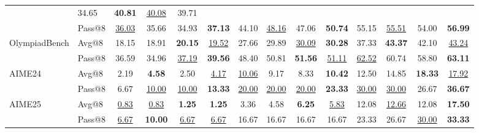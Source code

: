 \begin{table}[!t]
{\begin{tabular}{ll*{4}{c}*{4}{c}*{4}{c}}
    & 34.65 & \textbf{40.81} & \underline{40.08} & \cellcolor{blue!10}39.71 \\
    & Pass@8 
    & \underline{36.03} & 35.66 & 34.93 & 
    \cellcolor{blue!10} \textbf{37.13} 
    & 44.10 & \underline{48.16} & 47.06 & \cellcolor{blue!10}\textbf{50.74} 
    & 55.15 & \underline{55.51} & 54.00 & \cellcolor{blue!10}\textbf{56.99} \\
\midrule
\multirow{2}{*}{OlympiadBench}
    & Avg@8  
    & 18.15 & 18.91 & \textbf{20.15} & 
    \cellcolor{blue!10} \underline{19.52} 
    & 27.66 & 29.89 & \underline{30.09} & \cellcolor{blue!10}\textbf{30.28} 
    & 37.33 & \textbf{43.37} & 42.10 & \cellcolor{blue!10}\underline{43.24} \\
    & Pass@8 
    & 36.59 & 34.96 & \underline{37.19} & 
    \cellcolor{blue!10} \textbf{39.56} 
    & 48.40 & 50.81 & \textbf{51.56} & \cellcolor{blue!10}\underline{51.11} 
    & \underline{62.52} & 60.74 & 58.80 & \cellcolor{blue!10}\textbf{63.11} \\
\midrule
\multirow{2}{*}{AIME24}
    & Avg@8  
    & 2.19 & \textbf{4.58} & 2.50 &
    \cellcolor{blue!10} \underline{4.17} 
    & \underline{10.06} & 9.17 & 8.33 & \cellcolor{blue!10}\textbf{10.42} 
    & 12.50 & 14.85 & \textbf{18.33} & \cellcolor{blue!10}\underline{17.92} \\
    & Pass@8 
    & 6.67 & \underline{10.00} & \underline{10.00} & 
    \cellcolor{blue!10} \textbf{13.33}  
    & \underline{20.00} & \underline{20.00} & \underline{20.00} & \cellcolor{blue!10}\textbf{23.33} 
    & \underline{30.00} & \underline{30.00} & 26.67 & \cellcolor{blue!10}\textbf{36.67} \\
\midrule
\multirow{2}{*}{AIME25}
    & Avg@8  
    & \underline{0.83} & \underline{0.83} & \textbf{1.25} & 
    \cellcolor{blue!10}\textbf{1.25} 
    & 3.36 & 4.58 & \textbf{6.25} & \cellcolor{blue!10}\underline{5.83} 
    & 12.08 & \underline{12.66} & 12.08 & \cellcolor{blue!10}\textbf{17.50} \\
    & Pass@8 
    & \underline{6.67} & \textbf{10.00} & \underline{6.67} & 
    \cellcolor{blue!10}\underline{6.67}
    & 16.67 & 16.67 & 16.67 & \cellcolor{blue!10}16.67 
    & 23.33 & 26.67 & \underline{30.00} & \cellcolor{blue!10}\textbf{33.33} \\
\bottomrule
\end{tabular}
}
\label{tab:main_results}
\end{table}




